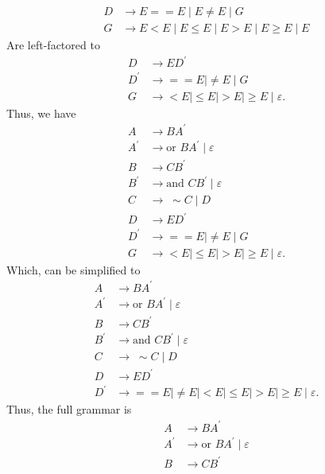 \documentclass{report}
\begin{document}
\begin{itemize}
        \begin{align*}
            D &\to E == E \mid E \ne E \mid G  \\
            G &\to E < E \mid E \leq E \mid E > E \mid E \geq E \mid E
        \end{align*}
        Are left-factored to
        \begin{align*}
            D &\to ED^{\prime} \\
            D^{\prime} &\to ==E \mid \ne E \mid G\\
            G&\to <E\mid \leq E \mid >E \mid \geq E \mid \varepsilon
        .\end{align*}
        \bigbreak \noindent 
        Thus, we have
        \begin{align*}
            A &\to BA^{\prime} \\
            A^{\prime} &\to \text{or } BA^{\prime} \mid \varepsilon \\
            B &\to CB^{\prime} \\
            B^{\prime} &\to \text{and }CB^{\prime} \mid \varepsilon \\
            C &\to\; \sim C \mid D\\
            D &\to ED^{\prime} \\
            D^{\prime} &\to ==E \mid \ne E \mid G\\
            G&\to <E\mid \leq E \mid >E \mid \geq E \mid \varepsilon
        .\end{align*}
        Which, can be simplified to 
        \begin{align*}
            A &\to BA^{\prime} \\
            A^{\prime} &\to \text{or } BA^{\prime} \mid \varepsilon \\
            B &\to CB^{\prime} \\
            B^{\prime} &\to \text{and }CB^{\prime} \mid \varepsilon \\
            C &\to\; \sim C \mid D\\
            D &\to ED^{\prime} \\
            D^{\prime} &\to ==E \mid \ne E \mid <E \mid \leq E \mid > E \mid \geq E \mid \varepsilon
        .\end{align*}
        Thus, the full grammar is 
        \begin{align*}
            A &\to BA^{\prime} \\
            A^{\prime} &\to \text{or } BA^{\prime} \mid \varepsilon \\
            B &\to CB^{\prime} \\

\end{align*}
\end{itemize}
\end{document}
